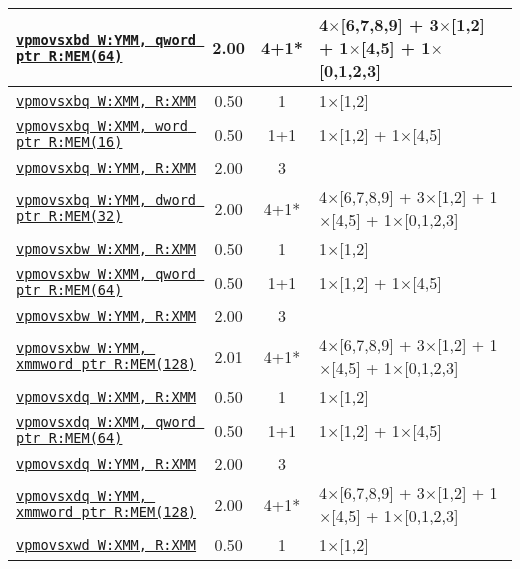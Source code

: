 \documentclass[a4paper,english,fontsize=9]{scrartcl}
\begin{document}
\begin{longtable}{p{}ccL{.25\textwidth}}
  \midrule
  \texttt{\href{https://felixcloutier.com/x86/PMOVSX.html}{vpmovsxbd W:YMM, qword ptr R:MEM(64)}} & 2.00 & 4+1* & 4\(\times\)[6,7,8,9] + 3\(\times\)[1,2] + 1\(\times\)[4,5] + 1\(\times\)[0,1,2,3] \\
  \midrule
  \texttt{\href{https://felixcloutier.com/x86/PMOVSX.html}{vpmovsxbq W:XMM, R:XMM}} & 0.50 & 1 & 1\(\times\)[1,2] \\
  \midrule
  \texttt{\href{https://felixcloutier.com/x86/PMOVSX.html}{vpmovsxbq W:XMM, word ptr R:MEM(16)}} & 0.50 & 1+1 & 1\(\times\)[1,2] + 1\(\times\)[4,5] \\
  \midrule
  \texttt{\href{https://felixcloutier.com/x86/PMOVSX.html}{vpmovsxbq W:YMM, R:XMM}} & 2.00 & 3 &  \\
  \midrule
  \texttt{\href{https://felixcloutier.com/x86/PMOVSX.html}{vpmovsxbq W:YMM, dword ptr R:MEM(32)}} & 2.00 & 4+1* & 4\(\times\)[6,7,8,9] + 3\(\times\)[1,2] + 1\(\times\)[4,5] + 1\(\times\)[0,1,2,3] \\
  \midrule
  \texttt{\href{https://felixcloutier.com/x86/PMOVSX.html}{vpmovsxbw W:XMM, R:XMM}} & 0.50 & 1 & 1\(\times\)[1,2] \\
  \midrule
  \texttt{\href{https://felixcloutier.com/x86/PMOVSX.html}{vpmovsxbw W:XMM, qword ptr R:MEM(64)}} & 0.50 & 1+1 & 1\(\times\)[1,2] + 1\(\times\)[4,5] \\
  \midrule
  \texttt{\href{https://felixcloutier.com/x86/PMOVSX.html}{vpmovsxbw W:YMM, R:XMM}} & 2.00 & 3 &  \\
  \midrule
  \texttt{\href{https://felixcloutier.com/x86/PMOVSX.html}{vpmovsxbw W:YMM, xmmword ptr R:MEM(128)}} & 2.01 & 4+1* & 4\(\times\)[6,7,8,9] + 3\(\times\)[1,2] + 1\(\times\)[4,5] + 1\(\times\)[0,1,2,3] \\
  \midrule
  \texttt{\href{https://felixcloutier.com/x86/PMOVSX.html}{vpmovsxdq W:XMM, R:XMM}} & 0.50 & 1 & 1\(\times\)[1,2] \\
  \midrule
  \texttt{\href{https://felixcloutier.com/x86/PMOVSX.html}{vpmovsxdq W:XMM, qword ptr R:MEM(64)}} & 0.50 & 1+1 & 1\(\times\)[1,2] + 1\(\times\)[4,5] \\
  \midrule
  \texttt{\href{https://felixcloutier.com/x86/PMOVSX.html}{vpmovsxdq W:YMM, R:XMM}} & 2.00 & 3 &  \\
  \midrule
  \texttt{\href{https://felixcloutier.com/x86/PMOVSX.html}{vpmovsxdq W:YMM, xmmword ptr R:MEM(128)}} & 2.00 & 4+1* & 4\(\times\)[6,7,8,9] + 3\(\times\)[1,2] + 1\(\times\)[4,5] + 1\(\times\)[0,1,2,3] \\
  \midrule
  \texttt{\href{https://felixcloutier.com/x86/PMOVSX.html}{vpmovsxwd W:XMM, R:XMM}} & 0.50 & 1 & 1\(\times\)[1,2] \\

\end{longtable}
\end{document}
